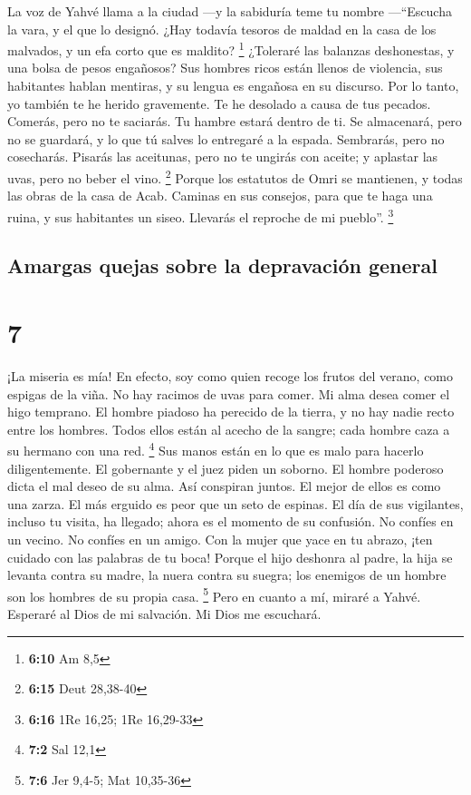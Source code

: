  La voz de Yahvé llama a la ciudad ---y la sabiduría teme
tu nombre ---``Escucha la vara, y el que lo designó. 
¿Hay todavía tesoros de maldad en la casa de los malvados, y un efa
corto que es maldito? \footnote{\textbf{6:10} Am 8,5} 
¿Toleraré las balanzas deshonestas, y una bolsa de pesos engañosos?
 Sus hombres ricos están llenos de violencia, sus
habitantes hablan mentiras, y su lengua es engañosa en su discurso.
 Por lo tanto, yo también te he herido gravemente. Te he
desolado a causa de tus pecados.  Comerás, pero no te
saciarás. Tu hambre estará dentro de ti. Se almacenará, pero no se
guardará, y lo que tú salves lo entregaré a la espada. 
Sembrarás, pero no cosecharás. Pisarás las aceitunas, pero no te ungirás
con aceite; y aplastar las uvas, pero no beber el vino. \footnote{\textbf{6:15}
  Deut 28,38-40}  Porque los estatutos de Omri se
mantienen, y todas las obras de la casa de Acab. Caminas en sus
consejos, para que te haga una ruina, y sus habitantes un siseo.
Llevarás el reproche de mi pueblo''. \footnote{\textbf{6:16} 1Re 16,25;
  1Re 16,29-33}

\hypertarget{amargas-quejas-sobre-la-depravaciuxf3n-general}{%
\subsection{Amargas quejas sobre la depravación
general}\label{amargas-quejas-sobre-la-depravaciuxf3n-general}}

\hypertarget{section-6}{%
\section{7}\label{section-6}}

 ¡La miseria es mía! En efecto, soy como quien recoge los
frutos del verano, como espigas de la viña. No hay racimos de uvas para
comer. Mi alma desea comer el higo temprano.  El hombre
piadoso ha perecido de la tierra, y no hay nadie recto entre los
hombres. Todos ellos están al acecho de la sangre; cada hombre caza a su
hermano con una red. \footnote{\textbf{7:2} Sal 12,1}  Sus
manos están en lo que es malo para hacerlo diligentemente. El gobernante
y el juez piden un soborno. El hombre poderoso dicta el mal deseo de su
alma. Así conspiran juntos.  El mejor de ellos es como una
zarza. El más erguido es peor que un seto de espinas. El día de sus
vigilantes, incluso tu visita, ha llegado; ahora es el momento de su
confusión.  No confíes en un vecino. No confíes en un
amigo. Con la mujer que yace en tu abrazo, ¡ten cuidado con las palabras
de tu boca!  Porque el hijo deshonra al padre, la hija se
levanta contra su madre, la nuera contra su suegra; los enemigos de un
hombre son los hombres de su propia casa. \footnote{\textbf{7:6} Jer
  9,4-5; Mat 10,35-36}  Pero en cuanto a mí, miraré a
Yahvé. Esperaré al Dios de mi salvación. Mi Dios me escuchará.

